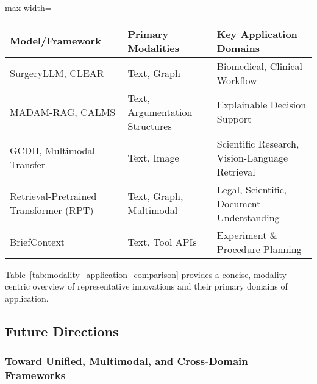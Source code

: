 \begin{table*}[htbp]
\centering
\caption{Representative Innovations in Knowledge-Augmented AI: Modalities and Applications}
\label{tab:modality_application_comparison}
\begin{adjustbox}{max width=\textwidth}
\begin{tabular}{lll}
\toprule
\textbf{Model/Framework}        & \textbf{Primary Modalities}                   & \textbf{Key Application Domains}                 \\
\midrule
SurgeryLLM, CLEAR               & Text, Graph                                   & Biomedical, Clinical Workflow                   \\
MADAM-RAG, CALMS                & Text, Argumentation Structures                & Explainable Decision Support                    \\
GCDH, Multimodal Transfer       & Text, Image                                   & Scientific Research, Vision-Language Retrieval  \\
Retrieval-Pretrained Transformer (RPT) & Text, Graph, Multimodal                         & Legal, Scientific, Document Understanding       \\
BriefContext                    & Text, Tool APIs                               & Experiment \& Procedure Planning                \\
\bottomrule
\end{tabular}
\end{adjustbox}
\end{table*}

Table~\ref{tab:modality_application_comparison} provides a concise, modality-centric overview of representative innovations and their primary domains of application.

\subsection{Future Directions}

\subsubsection{Toward Unified, Multimodal, and Cross-Domain Frameworks}

